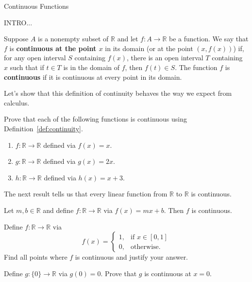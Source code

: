 \begin{section}{Continuous Functions}\label{sec:Continuity}

INTRO...

\begin{definition}\label{def:continuity}
Suppose $A$ is a nonempty subset of $\mathbb{R}$ and let $f:A\to \mathbb{R}$ be a function. We say that $f$ is \textbf{continuous at the point $x$} in its domain (or at the point $(x,f(x))$) if, for any open interval $S$ containing $f(x)$, there is an open interval $T$ containing $x$ such that if $t\in T$ is in the domain of $f$, then $f(t)\in S$. The function $f$ is \textbf{continuous} if it is continuous at every point in its domain.
\end{definition}

Let's show that this definition of continuity behaves the way we expect from calculus.

\begin{problem}
Prove that each of the following functions is continuous using Definition~\ref{def:continuity}.
\begin{enumerate}[label=\textrm{(\alph*)}]
\item $f:\mathbb{R}\to \mathbb{R}$ defined via $f(x)=x$.
\item $g:\mathbb{R}\to \mathbb{R}$ defined via $g(x)=2x$.
\item $h:\mathbb{R}\to \mathbb{R}$ defined via $h(x)=x+3$.
\end{enumerate}
\end{problem}

The next result tells us that every linear function from $\mathbb{R}$ to $\mathbb{R}$ is continuous.

\begin{theorem}
Let $m,b\in\mathbb{R}$ and define $f:\mathbb{R}\to\mathbb{R}$ via $f(x)=mx+b$. Then $f$ is continuous.
\end{theorem}

\begin{problem}
Define $f:\mathbb{R}\to\mathbb{R}$ via 
\[
f(x)=\begin{cases}
1, & \text{if }x\in[0,1]\\
0, & \text{otherwise}.
\end{cases}
\]
Find all points where $f$ is continuous and justify your answer.
\end{problem}

\begin{problem}
Define $g:\{0\}\to \mathbb{R}$ via $g(0)=0$.  Prove that $g$ is continuous at $x=0$.
\end{problem}


\end{section}
